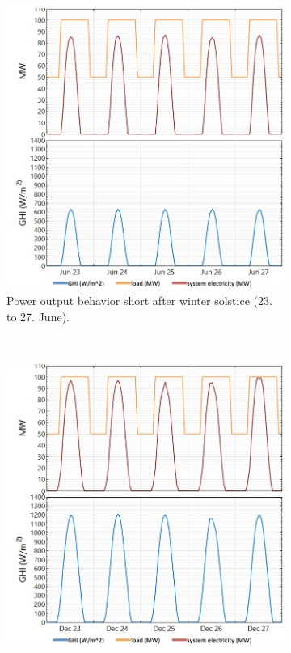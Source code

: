 \begin{figure}[!htbp]
        \centering                
        \begin{subfigure}[b]{0.5\textwidth}
                \centering
                \includegraphics[width=1\textwidth]{FIG/PVwithoutEESwinter}
                \caption{Power output behavior short after winter solstice (23. to 27. June).}\label{PVwithoutEESwinter}
        \end{subfigure}%
        ~
        \begin{subfigure}[b]{0.5\textwidth}
                \centering
                \includegraphics[width=1\textwidth]{FIG/PVwithoutEESsummer}

\end{subfigure}
\end{figure}
